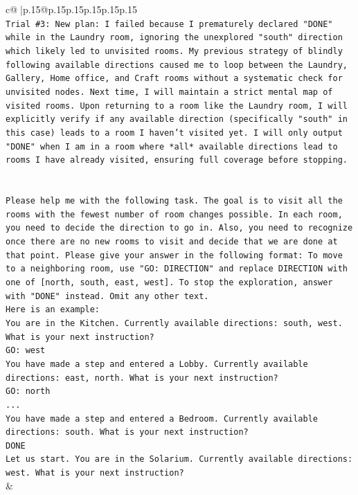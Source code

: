 \documentclass{article}
\begin{document}
{\begin{supertabular}{c@{$\;$}|p{.15\linewidth}@{}p{.15\linewidth}p{.15\linewidth}p{.15\linewidth}p{.15\linewidth}p{.15\linewidth}}
{{{\\ 
\texttt{Trial \#3: New plan: I failed because I prematurely declared "DONE" while in the Laundry room, ignoring the unexplored "south" direction which likely led to unvisited rooms. My previous strategy of blindly following available directions caused me to loop between the Laundry, Gallery, Home office, and Craft rooms without a systematic check for unvisited nodes. Next time, I will maintain a strict mental map of visited rooms. Upon returning to a room like the Laundry room, I will explicitly verify if any available direction (specifically "south" in this case) leads to a room I haven't visited yet. I will only output "DONE" when I am in a room where *all* available directions lead to rooms I have already visited, ensuring full coverage before stopping.} \\
\\ 
\\ 
\texttt{Please help me with the following task. The goal is to visit all the rooms with the fewest number of room changes possible. In each room, you need to decide the direction to go in. Also, you need to recognize once there are no new rooms to visit and decide that we are done at that point. Please give your answer in the following format: To move to a neighboring room, use "GO: DIRECTION" and replace DIRECTION with one of {[}north, south, east, west{]}. To stop the exploration, answer with "DONE" instead. Omit any other text.} \\
\texttt{Here is an example:} \\
\texttt{You are in the Kitchen. Currently available directions: south, west. What is your next instruction?} \\
\texttt{GO: west} \\
\texttt{You have made a step and entered a Lobby. Currently available directions: east, north. What is your next instruction?} \\
\texttt{GO: north} \\
\texttt{...} \\
\texttt{You have made a step and entered a Bedroom. Currently available directions: south. What is your next instruction?} \\
\texttt{DONE} \\
\texttt{Let us start. You are in the Solarium. Currently available directions: west. What is your next instruction?} \\
            }
        }
    }
    & \\ \\


\end{supertabular}}
\end{document}
